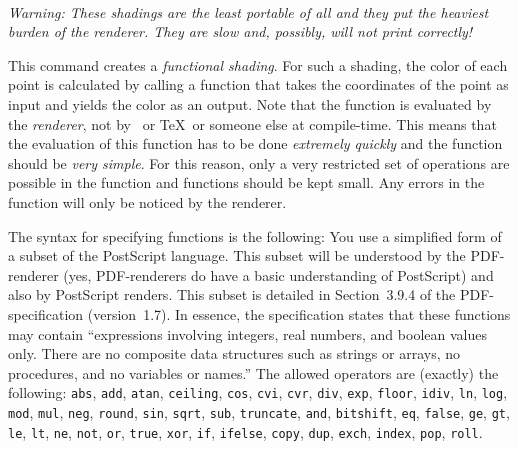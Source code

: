 \begin{command}{\pgfdeclarefunctionalshading{}\\
}
    \emph{Warning: These shadings are the least portable of all and they put
    the heaviest burden of the renderer. They are slow and, possibly, will not
    print correctly!}

    This command creates a \emph{functional shading}. For such a shading, the
    color of each point is calculated by calling a function that takes the
    coordinates of the point as input and yields the color as an output. Note
    that the function is evaluated by the \emph{renderer}, not by \pgfname\ or
    \TeX\ or someone else at compile-time. This means that the evaluation of
    this function has to be done \emph{extremely quickly} and the function
    should be \emph{very simple}. For this reason, only a very restricted set
    of operations are possible in the function and functions should be kept
    small. Any errors in the function will only be noticed by the renderer.

    The syntax for specifying functions is the following: You use a simplified
    form of a subset of the PostScript language. This subset will be understood
    by the PDF-renderer (yes, PDF-renderers do have a basic understanding of
    PostScript) and also by PostScript renders. This subset is detailed in
    Section~3.9.4 of the PDF-specification (version~1.7). In essence, the
    specification states that these functions may contain ``expressions
    involving integers, real numbers, and boolean values only. There are no
    composite data structures such as strings or arrays, no procedures, and no
    variables or names.'' The allowed operators are (exactly) the following:
    \texttt{abs}, \texttt{add}, \texttt{atan}, \texttt{ceiling}, \texttt{cos},
    \texttt{cvi}, \texttt{cvr}, \texttt{div}, \texttt{exp}, \texttt{floor},
    \texttt{idiv}, \texttt{ln}, \texttt{log}, \texttt{mod}, \texttt{mul},
    \texttt{neg}, \texttt{round}, \texttt{sin}, \texttt{sqrt}, \texttt{sub},
    \texttt{truncate}, \texttt{and}, \texttt{bitshift}, \texttt{eq},
    \texttt{false}, \texttt{ge}, \texttt{gt}, \texttt{le}, \texttt{lt},
    \texttt{ne}, \texttt{not}, \texttt{or}, \texttt{true}, \texttt{xor},
    \texttt{if}, \texttt{ifelse}, \texttt{copy}, \texttt{dup}, \texttt{exch},
    \texttt{index}, \texttt{pop}, \texttt{roll}.


\end{command}
